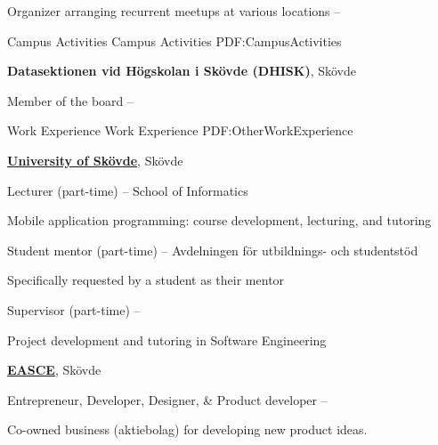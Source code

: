 \documentclass[letterpaper,MMMyyyy,nonstopmode]{resume}
\begin{document}
\begin{Body}
\Gap
\BulletItem
Organizer arranging recurrent meetups at various locations
\hfill
{} -- 


\Section
{Campus Activities}
{Campus Activities}
{PDF:CampusActivities}

\Entry
\textbf{Datasektionen vid Högskolan i Skövde (DHISK)}, Skövde

\Gap
\BulletItem
Member of the board
\hfill
{} -- 


\Section
{Work Experience}
{Work Experience}
{PDF:OtherWorkExperience}

\Entry
\href{http://his.se}
{\textbf{University of Skövde}}, Skövde

\Gap
\BulletItem
Lecturer (part-time)
\hfill
{} --
\newline
School of Informatics
\begin{Detail}
\SubBulletItem
Mobile application programming: course development, lecturing, and tutoring
\end{Detail}

\Gap
\BulletItem
Student mentor (part-time)
\hfill
{} --
\newline
Avdelningen för utbildnings- och studentstöd
\begin{Detail}
\SubBulletItem
Specifically requested by a student as their mentor
\end{Detail}

\Gap
\BulletItem
Supervisor (part-time)
\hfill
{} --
\begin{Detail}
\SubBulletItem
Project development and tutoring in Software Engineering
\end{Detail}

\BigGap
\Entry
\href{http://easce.com/}
{\textbf{EASCE}}, Skövde

\Gap
\BulletItem
Entrepreneur, Developer, Designer, \& Product developer
\hfill
{} --
\begin{Detail}
\SubBulletItem
Co-owned business (aktiebolag) for developing new product ideas. 
\end{Detail}


\end{Body}
\end{document}
